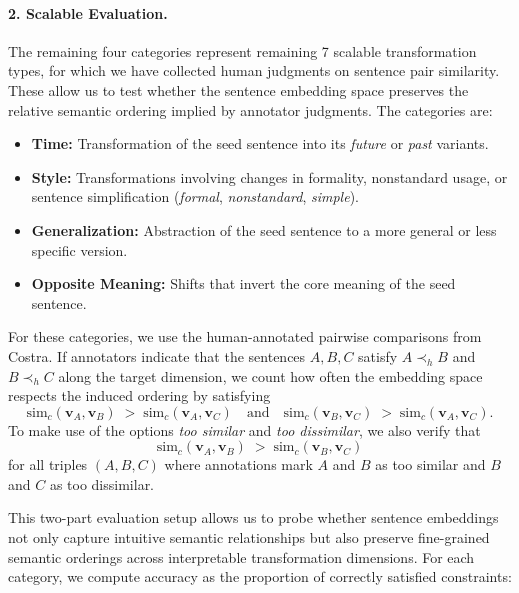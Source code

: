 \paragraph{2. Scalable Evaluation.}  
The remaining four categories represent remaining 7 scalable transformation types, for which we have collected human judgments on sentence pair similarity. These allow us to test whether the sentence embedding space preserves the relative semantic ordering implied by annotator judgments. The categories are:

\begin{itemize}
    \item \textbf{Time:} Transformation of the seed sentence into its \textit{future} or \textit{past} variants.
    \item \textbf{Style:} Transformations involving changes in formality, nonstandard usage, or sentence simplification (\textit{formal}, \textit{nonstandard}, \textit{simple}).
    \item \textbf{Generalization:} Abstraction of the seed sentence to a more general or less specific version.
    \item \textbf{Opposite Meaning:} Shifts that invert the core meaning of the seed sentence.
\end{itemize}

For these categories, we use the human-annotated pairwise comparisons from Costra. If annotators indicate that the sentences $A,B,C$ satisfy $A \prec_{h}B$ and $B\prec_{h}C$ along the target dimension, we count how often the embedding space respects the induced ordering by satisfying
\[
\mathrm{sim}_c\!\left(\mathbf{v}_{A},\mathbf{v}_{B}\right) \;>\; \mathrm{sim}_c\!\left(\mathbf{v}_{A},\mathbf{v}_{C}\right)
\quad\text{and}\quad
\mathrm{sim}_c\!\left(\mathbf{v}_{B},\mathbf{v}_{C}\right) \;>\; \mathrm{sim}_c\!\left(\mathbf{v}_{A},\mathbf{v}_{C}\right).
\]
To make use of the options \textit{too similar} and \textit{too dissimilar}, we also verify that
\[
\mathrm{sim}_c\!\left(\mathbf{v}_{A},\mathbf{v}_{B}\right) \;>\; \mathrm{sim}_c\!\left(\mathbf{v}_{B},\mathbf{v}_{C}\right)
\]
for all triples $(A,B,C)$ where annotations mark $A$ and $B$ as too similar and $B$ and $C$ as too dissimilar.

This two-part evaluation setup allows us to probe whether sentence embeddings not only capture intuitive semantic relationships but also preserve fine-grained semantic orderings across interpretable transformation dimensions. For each category, we compute accuracy as the proportion of correctly satisfied constraints:

